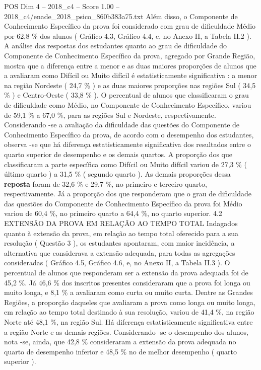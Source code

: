 \begin{textsample}{POS Dim 4 – 2018\_c4 – Score 1.00 – 2018\_c4/enade\_2018\_psico\_860b383a75.txt}
Além disso, o Componente de Conhecimento Específico da prova foi considerado com grau de dificuldade Médio por 62,8 \% dos alunos ( Gráfico 4.3, Gráfico 4.4, e, no Anexo II, a Tabela II.2 ).
A análise das respostas dos estudantes quanto ao grau de dificuldade do Componente de Conhecimento Específico da prova, agregado por Grande Região, mostra que a diferença entre a menor e as duas maiores proporções de alunos que a avaliaram como Difícil ou Muito difícil é estatisticamente significativa : a menor na região Nordeste ( 24,7 \% ) e as duas maiores proporções nas regiões Sul ( 34,5 \% ) e Centro-Oeste ( 33,8 \% ).
O percentual de alunos que classificaram o grau de dificuldade como Médio, no Componente de Conhecimento Específico, variou de 59,1 \% a 67,0 \%, para as regiões Sul e Nordeste, respectivamente.
Considerando -se a avaliação da dificuldade das questões do Componente de Conhecimento Específico da prova, de acordo com o desempenho dos estudantes, observa -se que há diferença estatisticamente significativa dos resultados entre o quarto superior de desempenho e os demais quartos.
A proporção dos que classificaram a parte específica como Difícil ou Muito difícil variou de 27,3 \% ( último quarto ) a 31,5 \% ( segundo quarto ).
As demais proporções dessa \textbf{reposta} foram de 32,6 \% e 29,7 \%, no primeiro e terceiro quarto, respectivamente.
Já a proporção dos que responderam que o grau de dificuldade das questões do Componente de Conhecimento Específico da prova foi Médio variou de 60,4 \%, no primeiro quarto a 64,4 \%, no quarto superior. 4.2 EXTENSÃO DA PROVA EM RELAÇÃO AO TEMPO TOTAL Indagados quanto à extensão da prova, em relação ao tempo total oferecido para a sua resolução ( Questão 3 ), os estudantes apontaram, com maior incidência, a alternativa que considerava a extensão adequada, para todas as agregações consideradas ( Gráfico 4.5, Gráfico 4.6, e, no Anexo II, a Tabela II.3 ).
O percentual de alunos que responderam ser a extensão da prova adequada foi de 45,2 \%.
Já 46,6 \% dos inscritos presentes consideraram que a prova foi longa ou muito longa, e 8,1 \% a avaliaram como curta ou muito curta.
Dentre as Grandes Regiões, a proporção daqueles que avaliaram a prova como longa ou muito longa, em relação ao tempo total destinado à sua resolução, variou de 41,4 \%, na região Norte até 48,1 \%, na região Sul.
Há diferença estatisticamente significativa entre a região Norte e as demais regiões.
Considerando -se o desempenho dos alunos, nota -se, ainda, que 42,8 \% consideraram a extensão da prova adequada no quarto de desempenho inferior e 48,5 \% no de melhor desempenho ( quarto superior ).

\end{textsample}

